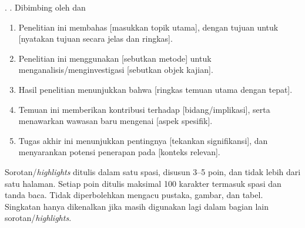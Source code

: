 

\noindent
\MakeUppercase{\NamaPenulis}. \JudulSkripsi\unskip. Dibimbing oleh
\MakeUppercase{\NamaPembimbingSatu} dan \MakeUppercase{\NamaPembimbingDua}

\begin{enumerate}[leftmargin=0.5cm,labelwidth=0.25cm,labelsep=0.25cm,
  align=left,itemsep=0pt,parsep=0pt,topsep=12pt,partopsep=0pt]
  \item Penelitian ini membahas [masukkan topik utama], dengan tujuan untuk
    [nyatakan tujuan secara jelas dan ringkas].
  \item Penelitian ini menggunakan [sebutkan metode] untuk
    menganalisis/menginvestigasi [sebutkan objek kajian].
  \item Hasil penelitian menunjukkan bahwa [ringkas temuan utama dengan tepat].
  \item Temuan ini memberikan kontribusi terhadap [bidang/implikasi], serta
    menawarkan wawasan baru mengenai [aspek spesifik].
  \item Tugas akhir ini menunjukkan pentingnya [tekankan signifikansi], dan
    menyarankan potensi penerapan pada [konteks relevan].
\end{enumerate}

\vspace{10pt}

\noindent
Sorotan/\textit{highlights} ditulis dalam satu spasi, disusun 3--5 poin, dan
tidak lebih dari satu halaman. Setiap poin ditulis maksimal 100 karakter
termasuk spasi dan tanda baca. Tidak diperbolehkan mengacu pustaka, gambar,
dan tabel. Singkatan hanya dikenalkan jika masih digunakan lagi dalam bagian
lain sorotan/\textit{highlights}.

